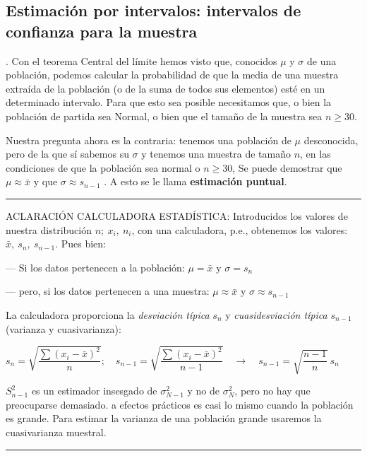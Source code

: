 \subsection{Estimación por intervalos: intervalos de confianza para la muestra}


\begin{definition}
.	Con el teorema Central del límite hemos visto que, conocidos $\mu$ y $\sigma$ de una población, podemos calcular la probabilidad de que la media de una muestra extraída de la población (o de la suma de todos sus elementos) esté en un determinado intervalo. Para que esto sea posible necesitamos que, o bien la población de partida sea Normal, o bien que el tamaño de la muestra sea $n\ge 30$.

	Nuestra pregunta ahora es la contraria: tenemos una población de $\mu$  desconocida, pero de la que sí sabemos su $\sigma$ y tenemos una muestra de tamaño $n$, en las condiciones de que la población sea normal o $n\ge 30$,  Se puede demostrar que $\mu\approx \bar x$  y que $\sigma \approx s_{n-1}$ .  A esto se le llama \textbf{estimación puntual}.
\end{definition}


\vspace{4mm}%
\rule{200pt}{0.1pt}

ACLARACIÓN CALCULADORA ESTADÍSTICA: Introducidos los valores de nuestra distribución $n;\ x_i,\ n_i$, con una calculadora, p.e., obtenemos los valores:  $\bar x, \ s_n, \ s_{n-1}$.  Pues bien:

--- Si los datos pertenecen a la población: $\mu=\bar x$    y  $\sigma=s_n$
  
--- pero, si los datos pertenecen a una muestra:  $\mu \approx \bar x$  y  $\sigma \approx s_{n-1}$ 

La calculadora proporciona la \emph{desviación típica} $s_n$   y \emph{cuasidesviación típica}  $s_{n-1}$ (varianza y cuasivarianza):

$ \displaystyle s_n=\sqrt{\dfrac{\sum (x_i-\bar x)^2}{n}}; \quad s_{n-1}=\sqrt{\dfrac{\sum (x_i-\bar x)^2}{n-1}} \quad \to \quad s_{n-1}=\sqrt{\dfrac{n-1}{n}}\ s_n$

$S^2_{n-1}$ es un estimador insesgado de $\sigma^2_{N-1}$ y no de $\sigma^2_{N}$, pero no hay que preocuparse demasiado. a efectos prácticos es casi lo mismo cuando la población es grande. Para estimar la varianza  de una población grande usaremos la cuasivarianza muestral.

\vspace{-4mm}%
\begin{flushright}
\rule{200pt}{0.1pt}	
\end{flushright}



